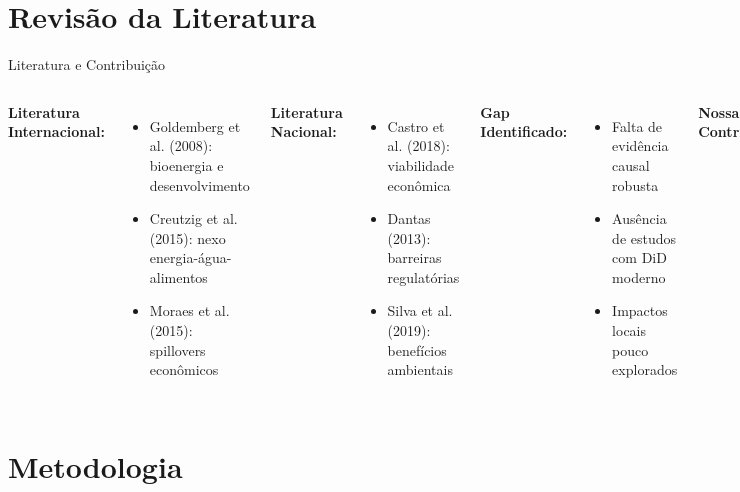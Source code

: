 \documentclass[10pt,aspectratio=169]{beamer}
\begin{document}
\section{Revisão da Literatura}

\begin{frame}{Literatura e Contribuição}
\begin{columns}
\textbf{Literatura Internacional:}
\begin{itemize}
    \item Goldemberg et al. (2008): bioenergia e desenvolvimento
    \item Creutzig et al. (2015): nexo energia-água-alimentos
    \item Moraes et al. (2015): spillovers econômicos
\end{itemize}

\textbf{Literatura Nacional:}
\begin{itemize}
    \item Castro et al. (2018): viabilidade econômica
    \item Dantas (2013): barreiras regulatórias
    \item Silva et al. (2019): benefícios ambientais
\end{itemize}

\textbf{Gap Identificado:}
\begin{itemize}
    \item Falta de evidência causal robusta
    \item Ausência de estudos com DiD moderno
    \item Impactos locais pouco explorados
\end{itemize}

\textbf{Nossa Contribuição:}
\begin{itemize}
    \item Metodologia state-of-the-art
    \item Identificação causal rigorosa
    \item Foco em spillovers regionais
\end{itemize}
\end{columns}
\end{frame}

\section{Metodologia}
\end{document}
